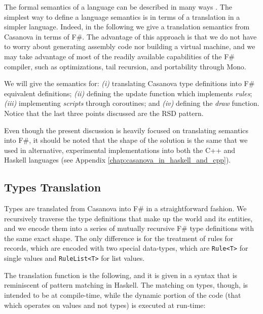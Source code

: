 The formal semantics of a language can be described in many ways \cite{CHAPTER_5_FORMAL_SEMANTICS}. The simplest way to define a language semantics is in terms of a translation in a simpler language. Indeed, in the following we give a translation semantics from Casanova in terms of F\#. The advantage of this approach is that we do not have to worry about generating assembly code nor building a virtual machine, and we may take advantage of most of the readily available capabilities of the F\# compiler, such as optimizations, tail recursion, and portability through Mono.

We will give the semantics for: \textit{(i)} translating Casanova type definitions into F\# equivalent definitions; \textit{(ii)} defining the update function which implements \textit{rules}; \textit{(iii)} implementing \textit{scripts} through coroutines; and \textit{(iv)} defining the \textit{draw} function. Notice that the last three points discussed are the RSD pattern.

Even though the present discussion is heavily focused on translating semantics into F\#, it should be noted that the shape of the solution is the same that we used in alternative, experimental implementations into both the C++ and Haskell languages (see Appendix \ref{chap:casanova_in_haskell_and_cpp}).

\subsection{Types Translation}
Types are translated from Casanova into F\# in a straightforward fashion. We recursively traverse the type definitions that make up the world and its entities, and we encode them into a series of mutually recursive F\# type definitions with the same exact shape. The only difference is for the treatment of rules for records, which are encoded with two special data-types, which are \texttt{Rule<T>} for single values and \texttt{RuleList<T>} for list values.

The translation function is the following, and it is given in a syntax that is reminiscent of pattern matching in Haskell. The matching on types, though, is intended to be at compile-time, while the dynamic portion of the code (that which operates on values and not types) is executed at run-time:

